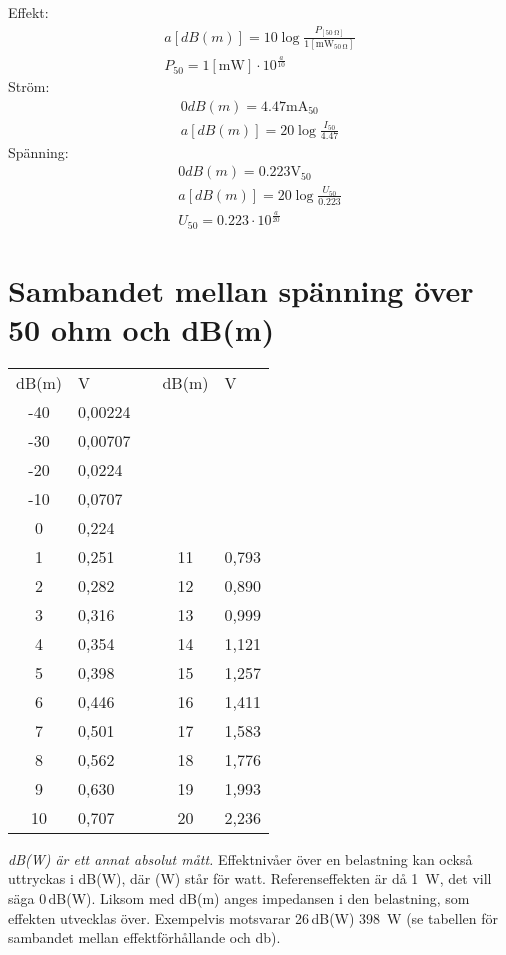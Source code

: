 \noindent
Effekt:
\begin{gather*}
  a [dB(m)] = 10 \log\frac{P_{[\qty{50}{\ohm}]}}{1[\unit{\milli\watt}_{\qty{50}{\ohm}}]} \\
  P_{50} = 1 [\unit{\milli\watt}] \cdot 10^{\frac{a}{10}}
\end{gather*}
Ström:
\begin{gather*}
  0 dB(m) = 4.47 \unit{\milli\ampere}_{50} \\
  a [dB(m)] = 20 \log\frac{I_{50}}{4.47}
\end{gather*}
Spänning:
\begin{gather*}
  0 dB(m) = 0.223 \unit{\volt}_{50} \\
  a [dB(m)] = 20 \log\frac{U_{50}}{0.223} \\
  U_{50} = 0.223 \cdot 10^{\frac{a}{20}}
\end{gather*}

\section{Sambandet mellan spänning över 50 ohm och dB(m)}

\begin{center}
\begin{tabular}{S[table-format=-3]|lp{1cm}S[table-format=-2]|l}
   & V & &   & V \\
   
  -40 & 0,00224 & & & \\
  -30 & 0,00707 & & & \\
  -20 & 0,0224  & & & \\
  -10 & 0,0707  & & & \\
  0   & 0,224   & & & \\
  1   & 0,251   & & 11 & 0,793 \\
  2   & 0,282   & & 12 & 0,890 \\
  3   & 0,316   & & 13 & 0,999 \\
  4   & 0,354   & & 14 & 1,121 \\
  5   & 0,398   & & 15 & 1,257 \\
  6   & 0,446   & & 16 & 1,411 \\
  7   & 0,501   & & 17 & 1,583 \\
  8   & 0,562   & & 18 & 1,776 \\
  9   & 0,630   & & 19 & 1,993 \\
  10  & 0,707   & & 20 & 2,236 \\
\end{tabular}
\end{center}

\emph{dB(W) är ett annat absolut mått.}
Effektnivåer över en belastning kan också uttryckas i dB(W), där (W) står
för watt.
Referenseffekten är då \qty{1}{\watt}, det vill säga 0\,dB(W).
Liksom med dB(m) anges impedansen i den belastning, som effekten utvecklas över.
Exempelvis motsvarar 26\,dB(W) \qty{398}{\watt} (se tabellen för sambandet
mellan effektförhållande och \unit{\decibel}).
